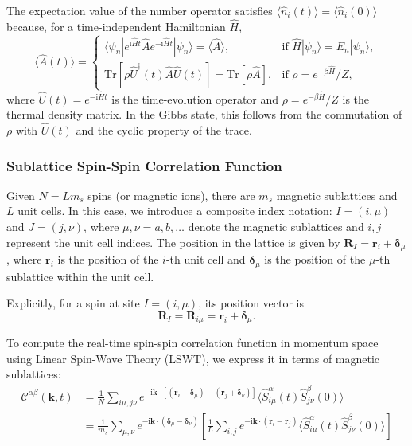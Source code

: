 \documentclass[aps, prx, nofootinbib, superscriptaddress]{revtex4-2}
\newcommand{\kvec}{\mathbf{k}}
\newcommand{\ri}{\mathrm{i}}
\begin{document}
The expectation value of the number operator satisfies $\langle \hat{n}_i(t) \rangle = \langle \hat{n}_i(0) \rangle$ because, for a time-independent Hamiltonian $\hat{H}$,
\begin{equation}
    \langle \hat{A}(t) \rangle = 
    \begin{cases}
        \langle \psi_n | e^{\ri \hat{H} t} \hat{A} e^{-\ri \hat{H} t} | \psi_n \rangle = \langle \hat{A} \rangle, & \text{if } \hat{H} | \psi_n \rangle = E_n | \psi_n \rangle, \\
        \mathrm{Tr} [ \rho \hat{U}^{\dagger}(t) \hat{A} \hat{U}(t) ] = \mathrm{Tr} [ \rho \hat{A} ], & \text{if } \rho = e^{-\beta \hat{H}} / Z,
    \end{cases}
\end{equation}
where $\hat{U}(t) = e^{-\ri \hat{H} t}$ is the time-evolution operator and $\rho = e^{-\beta \hat{H}} / Z$ is the thermal density matrix. In the Gibbs state, this follows from the commutation of $\rho$ with $\hat{U}(t)$ and the cyclic property of the trace.





\subsubsection{Sublattice Spin-Spin Correlation Function}

Given $N = L m_s$ spins (or magnetic ions), there are $m_{s}$ magnetic sublattices and $L$ unit cells. 
In this case, we introduce a composite index notation: $I = (i, \mu)$ and $J = (j, \nu)$, where $\mu, \nu = a, b, \dots$ denote the magnetic sublattices and $i, j$ represent the unit cell indices. The position in the lattice is given by $\mathbf{R}_{I} = \mathbf{r}_{i} + \boldsymbol{\delta}_{\mu}$, where $\mathbf{r}_i$ is the position of the $i$-th unit cell and $\boldsymbol{\delta}_\mu$ is the position of the $\mu$-th sublattice within the unit cell.

Explicitly, for a spin at site $I = (i, \mu)$, its position vector is
\begin{equation}
    \mathbf{R}_{I} = \mathbf{R}_{i\mu} = \mathbf{r}_{i} + \boldsymbol{\delta}_{\mu}.
\end{equation}

To compute the real-time spin-spin correlation function in momentum space using Linear Spin-Wave Theory (LSWT), we express it in terms of magnetic sublattices:
\begin{align}
    \mathcal{C}^{\alpha\beta}(\kvec, t) 
    &= \frac{1}{N} \sum_{i\mu,j\nu} e^{-\ri\kvec \cdot [(\mathbf{r}_{i} + \boldsymbol{\delta}_{\mu}) - (\mathbf{r}_{j} + \boldsymbol{\delta}_{\nu})]} \langle \hat{S}_{i\mu}^{\alpha}(t) \hat{S}_{j\nu}^{\beta}(0) \rangle \\
    &= \frac{1}{m_{s}} \sum_{\mu,\nu} e^{-\ri\kvec \cdot (\boldsymbol{\delta}_{\mu} - \boldsymbol{\delta}_{\nu})}
    \left[
    \frac{1}{L} \sum_{i,j} e^{-\ri\kvec \cdot (\mathbf{r}_{i} - \mathbf{r}_{j})} 
    \langle \hat{S}_{i\mu}^{\alpha}(t) \hat{S}_{j\nu}^{\beta}(0) \rangle \right] 
\end{align}
\end{document}
